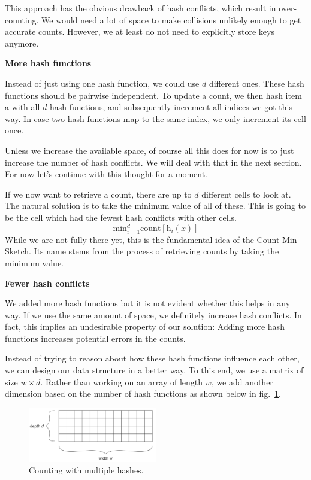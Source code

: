 \documentclass{hw}
\begin{document}
\begin{problem}
This approach has the obvious drawback of hash conflicts, which result in over-counting. We would need a lot of space to make collisions unlikely enough to get accurate counts. However, we at least do not need to explicitly store keys anymore.

\textbf{More hash functions}

Instead of just using one hash function, we could use $d$ different ones. These hash functions should be pairwise independent. To update a count, we then hash item a with all $d$ hash functions, and subsequently increment all indices we got this way. In case two hash functions map to the same index, we only increment its cell once.

Unless we increase the available space, of course all this does for now is to just increase the number of hash conflicts. We will deal with that in the next section. For now let’s continue with this thought for a moment.

If we now want to retrieve a count, there are up to $d$
 different cells to look at. The natural solution is to take the minimum value of all of these. This is going to be the cell which had the fewest hash conflicts with other cells.
$$\text{min}_{i=1}^d \text{count}[\text{h}_i(x)]$$
While we are not fully there yet, this is the fundamental idea of the Count-Min Sketch. Its name stems from the process of retrieving counts by taking the minimum value.


\textbf{Fewer hash conflicts}

We added more hash functions but it is not evident whether this helps in any way. If we use the same amount of space, we definitely increase hash conflicts. In fact, this implies an undesirable property of our solution: Adding more hash functions increases potential errors in the counts.

Instead of trying to reason about how these hash functions influence each other, we can design our data structure in a better way. To this end, we use a matrix of size $w \times d$. Rather than working on an array of length $w$, we add another dimension based on the number of hash functions as shown below in fig.~\ref{fig:multi-hash}.

\begin{figure}[H]
    \centering
    \includegraphics[width=0.5\textwidth]{figures/multiple_hashes.png}
    \caption{Counting with multiple hashes.}
    \label{fig:multi-hash}
\end{figure}


\end{problem}
\end{document}
